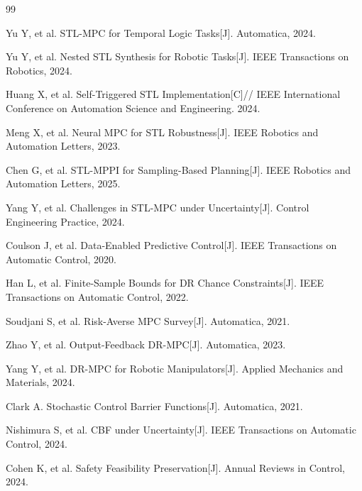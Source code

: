 \documentclass[12pt,a4paper]{ctexart}
\numberwithin{equation}{section}
\begin{document}
\clearpage
\begin{thebibliography}{99}
    \setlength{\itemsep}{0pt}
    \setlength{\parsep}{0pt}

    Yu Y, et al. STL-MPC for Temporal Logic Tasks[J]. Automatica, 2024.

    Yu Y, et al. Nested STL Synthesis for Robotic Tasks[J]. IEEE Transactions on Robotics, 2024.

    Huang X, et al. Self-Triggered STL Implementation[C]// IEEE International Conference on Automation Science and Engineering. 2024.

    Meng X, et al. Neural MPC for STL Robustness[J]. IEEE Robotics and Automation Letters, 2023.

    Chen G, et al. STL-MPPI for Sampling-Based Planning[J]. IEEE Robotics and Automation Letters, 2025.

    Yang Y, et al. Challenges in STL-MPC under Uncertainty[J]. Control Engineering Practice, 2024.

    Coulson J, et al. Data-Enabled Predictive Control[J]. IEEE Transactions on Automatic Control, 2020.

    Han L, et al. Finite-Sample Bounds for DR Chance Constraints[J]. IEEE Transactions on Automatic Control, 2022.

    Soudjani S, et al. Risk-Averse MPC Survey[J]. Automatica, 2021.

    Zhao Y, et al. Output-Feedback DR-MPC[J]. Automatica, 2023.

    Yang Y, et al. DR-MPC for Robotic Manipulators[J]. Applied Mechanics and Materials, 2024.

    Clark A. Stochastic Control Barrier Functions[J]. Automatica, 2021.

    Nishimura S, et al. CBF under Uncertainty[J]. IEEE Transactions on Automatic Control, 2024.

    Cohen K, et al. Safety Feasibility Preservation[J]. Annual Reviews in Control, 2024.


\end{thebibliography}
\end{document}
